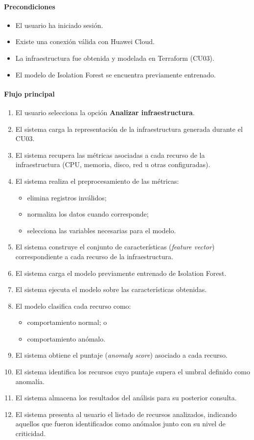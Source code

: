 \paragraph*{Precondiciones}

\begin{itemize}
\item El usuario ha iniciado sesión.
\item Existe una conexión válida con Huawei Cloud.
\item La infraestructura fue obtenida y modelada en Terraform (CU03).
\item El modelo de Isolation Forest se encuentra previamente entrenado.
\end{itemize}

\paragraph*{Flujo principal}

\begin{enumerate}
\item El usuario selecciona la opción \textbf{Analizar infraestructura}.
\item El sistema carga la representación de la infraestructura generada durante el CU03.
\item El sistema recupera las métricas asociadas a cada recurso de la infraestructura (CPU, memoria, disco, red u otras configuradas).
\item El sistema realiza el preprocesamiento de las métricas:
  \begin{itemize}
  \item elimina registros inválidos;
  \item normaliza los datos cuando corresponde;
  \item selecciona las variables necesarias para el modelo.
  \end{itemize}
\item El sistema construye el conjunto de características (\emph{feature vector}) correspondiente a cada recurso de la infraestructura.
\item El sistema carga el modelo previamente entrenado de Isolation Forest.
\item El sistema ejecuta el modelo sobre las características obtenidas.
\item El modelo clasifica cada recurso como:
  \begin{itemize}
  \item comportamiento normal; o
  \item comportamiento anómalo.
  \end{itemize}
\item El sistema obtiene el puntaje (\emph{anomaly score}) asociado a cada recurso.
\item El sistema identifica los recursos cuyo puntaje supera el umbral definido como anomalía.
\item El sistema almacena los resultados del análisis para su posterior consulta.
\item El sistema presenta al usuario el listado de recursos analizados, indicando aquellos que fueron identificados como anómalos junto con su nivel de criticidad.
\end{enumerate}

